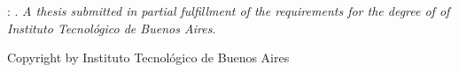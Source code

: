 \vspace*{0.8\textheight}
\noindent \@author: \@titleEN. \textit{A thesis submitted in partial fulfillment of the requirements for the degree of \textbf{\@degree} of  Instituto Tecnológico de Buenos Aires}.
\par
\vspace{1\baselineskip}
\noindent Copyright \textcopyright\space\@copyrightYear\space by Instituto Tecnológico de Buenos Aires